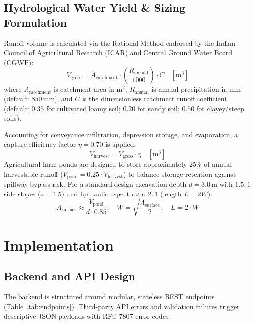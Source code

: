 \documentclass[manuscript,screen,review]{acmart}
\begin{document}
\subsection{Hydrological Water Yield \& Sizing Formulation}
Runoff volume is calculated via the Rational Method endorsed by the Indian Council of Agricultural Research (ICAR) and Central Ground Water Board (CGWB):
\begin{equation}
    V_{\text{gross}} = A_{\text{catchment}} \cdot \left(\frac{R_{\text{annual}}}{1000}\right) \cdot C \quad [\text{m}^3]
\end{equation}
where $A_{\text{catchment}}$ is catchment area in $\text{m}^2$, $R_{\text{annual}}$ is annual precipitation in mm (default: 850\,mm), and $C$ is the dimensionless catchment runoff coefficient (default: $0.35$ for cultivated loamy soil; $0.20$ for sandy soil; $0.50$ for clayey/steep soils).

Accounting for conveyance infiltration, depression storage, and evaporation, a capture efficiency factor $\eta = 0.70$ is applied:
\begin{equation}
    V_{\text{harvest}} = V_{\text{gross}} \cdot \eta \quad [\text{m}^3]
\end{equation}
Agricultural farm ponds are designed to store approximately 25\% of annual harvestable runoff ($V_{\text{pond}} = 0.25 \cdot V_{\text{harvest}}$) to balance storage retention against spillway bypass risk. For a standard design excavation depth $d = 3.0$\,m with $1.5:1$ side slopes ($z = 1.5$) and hydraulic aspect ratio $2:1$ (length $L = 2W$):
\begin{equation}
    A_{\text{surface}} \approx \frac{V_{\text{pond}}}{d \cdot 0.85}, \quad W = \sqrt{\frac{A_{\text{surface}}}{2}}, \quad L = 2 \cdot W
\end{equation}

\section{Implementation}
\label{sec:implementation}

\subsection{Backend and API Design}
The backend is structured around modular, stateless REST endpoints (Table~\ref{tab:endpoints}). Third-party API errors and validation failures trigger descriptive JSON payloads with RFC 7807 error codes.
\end{document}
